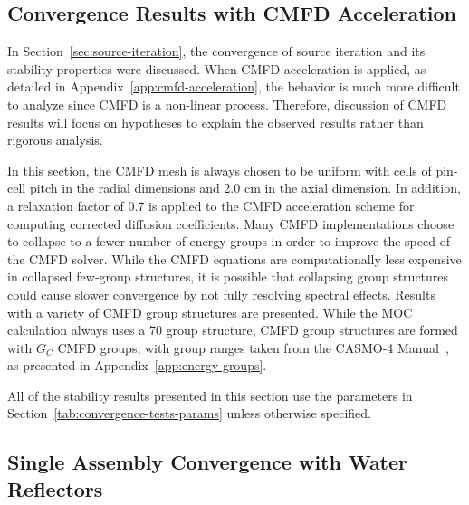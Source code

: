 \subsection{Convergence Results with CMFD Acceleration}
\label{sec:cmfd-stab}

In Section~\ref{sec:source-iteration}, the convergence of source iteration and its stability properties were discussed. When \ac{CMFD} acceleration is applied, as detailed in Appendix~\ref{app:cmfd-acceleration}, the behavior is much more difficult to analyze since \ac{CMFD} is a non-linear process. Therefore, discussion of \ac{CMFD} results will focus on hypotheses to explain the observed results rather than rigorous analysis. 

In this section, the \ac{CMFD} mesh is always chosen to be uniform with cells of pin-cell pitch in the radial dimensions and 2.0 cm in the axial dimension. In addition, a relaxation factor of 0.7 is applied to the \ac{CMFD} acceleration scheme for computing corrected diffusion coefficients. Many \ac{CMFD} implementations choose to collapse to a fewer number of energy groups in order to improve the speed of the \ac{CMFD} solver. While the \ac{CMFD} equations are computationally less expensive in collapsed few-group structures, it is possible that collapsing group structures could cause slower convergence by not fully resolving spectral effects. Results with a variety of \ac{CMFD} group structures are presented. While the \ac{MOC} calculation always uses a 70 group structure, \ac{CMFD} group structures are formed with $G_C$ \ac{CMFD} groups, with group ranges taken from the CASMO-4 Manual~\cite{edenius1995casmo}, as presented in Appendix~\ref{app:energy-groups}.

All of the stability results presented in this section use the parameters in Section~\ref{tab:convergence-tests-params} unless otherwise specified.

\subsection{Single Assembly Convergence with Water Reflectors}
\label{sec:sa-axial-ref}

